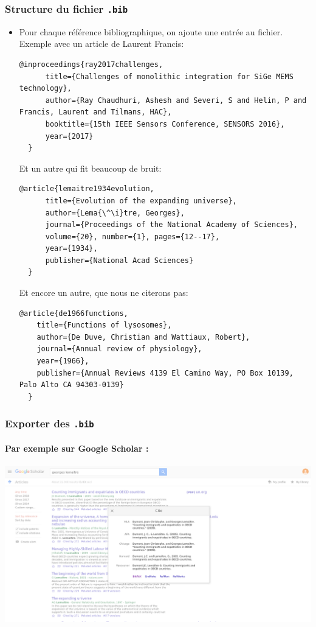 \begin{frame}
  \frametitle{Structure du fichier \texttt{.bib}}
  \begin{itemize}
      \item Pour chaque référence bibliographique, on ajoute une entrée au fichier. Exemple avec un article de Laurent Francis:
        \begin{lstlisting}[style=nonumbers]
  @inproceedings{ray2017challenges,
      title={Challenges of monolithic integration for SiGe MEMS technology},
      author={Ray Chaudhuri, Ashesh and Severi, S and Helin, P and Francis, Laurent and Tilmans, HAC},
      booktitle={15th IEEE Sensors Conference, SENSORS 2016},
      year={2017}
  }
        \end{lstlisting}
      Et un autre qui fit beaucoup de bruit:
      \begin{lstlisting}[style=nonumbers]
  @article{lemaitre1934evolution,
      title={Evolution of the expanding universe},
      author={Lema{\^\i}tre, Georges},
      journal={Proceedings of the National Academy of Sciences},
      volume={20}, number={1}, pages={12--17},
      year={1934},
      publisher={National Acad Sciences}
  }
      \end{lstlisting}
      \framebreak
      Et encore un autre, que nous ne citerons pas:
      \begin{lstlisting}[style=nonumbers]
  @article{de1966functions,
    title={Functions of lysosomes},
    author={De Duve, Christian and Wattiaux, Robert},
    journal={Annual review of physiology},
    year={1966},
    publisher={Annual Reviews 4139 El Camino Way, PO Box 10139, Palo Alto CA 94303-0139}
  }
      \end{lstlisting}
  \end{itemize}
\end{frame}

\begin{frame}[fragile]
  \frametitle{Exporter des \texttt{.bib}}
  \framesubtitle{Par exemple sur Google Scholar :}
  \begin{center}
  \includegraphics[width=\textwidth]{img/scholar.png}
  \end{center}
\end{frame}

